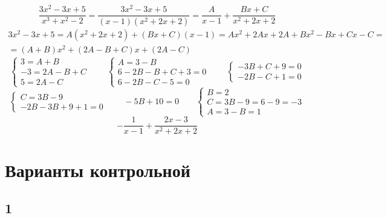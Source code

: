 $$ \frac{3x^2 - 3x + 5}{x^3 + x^2 - 2} = \frac{3x^2 - 3x + 5}{(x - 1)(x^2 + 2x + 2)} = \frac{A}{x - 1} + \frac{Bx + C}{x^2 + 2x + 2} $$
\begin{multline*}
    3x^2 - 3x + 5 = A(x^2 + 2x + 2) + (Bx + C)(x - 1) = Ax^2 + 2Ax + 2A + Bx^2 - Bx + Cx - C = \\
    = (A + B)x^2 + (2A - B + C)x + (2A - C)
\end{multline*}
$$
\begin{cases}
	3 = A + B \\
    -3 = 2A - B + C \\
    5 = 2A - C
\end{cases} \qquad
\begin{cases}
	A = 3 - B \\
    6 - 2B - B + C + 3 = 0 \\
    6 - 2B - C - 5 = 0
\end{cases} \qquad
\begin{cases}
	-3B + C + 9 = 0 \\
    -2B - C + 1 = 0
\end{cases} $$
$$
\begin{cases}
	C = 3B - 9 \\
    -2B - 3B + 9 + 1 = 0
\end{cases} \qquad -5B + 10 = 0 \qquad
\begin{cases}
	B = 2 \\
    C = 3B - 9 = 6 - 9 = -3 \\
    A = 3 - B = 1
\end{cases} $$
$$ -\frac1{x - 1} + \frac{2x - 3}{x^2 + 2x + 2} $$

\section{Варианты контрольной}

\subsection{1}

